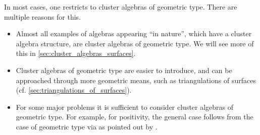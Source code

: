 \medskip

In most cases, one restricts to cluster algebras of geometric type. There are multiple
reasons for this.
\begin{itemize}
	\item Almost all examples of algebras appearing ``in nature'', which have a cluster algebra
	      structure, are cluster algebras of geometric type. We will see more of this in
	      \cref{sec:cluster_algebras_surfaces}.
	\item Cluster algebras of geometric type are easier to introduce, and can be approached
	      through more geometric means, such as triangulations of surfaces (cf.
	      \cref{sec:triangulations_of_surfaces}).
	\item For some major problems it is sufficient to consider cluster algebras of geometric
	      type. For example, for positivity, the general case follows from the case of geometric
	      type via \cite[Theorem 3.7]{FominZelevinsky2007CA4Coefficients} as pointed out by
	      \textcite[Proof of Theorem 4.2]{LeeSchiffler2015PositivityCA}.
\end{itemize}


